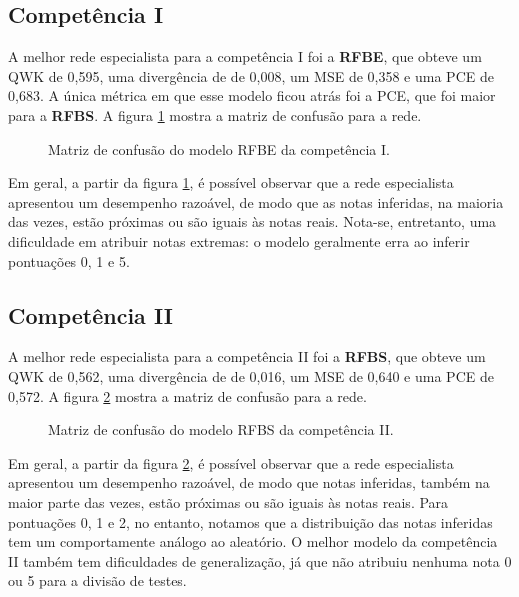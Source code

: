\subsection{Competência I}
\label{subsec:eval-c1}

A melhor rede especialista para a competência I foi a \textbf{RFBE}, que obteve um QWK de 0,595, uma divergência de de 0,008, um MSE de 0,358 e uma PCE de 0,683. A única métrica em que esse modelo ficou atrás foi a PCE, que foi maior para a \textbf{RFBS}. A figura \ref{fig:eval-c1-confusion-matrix} mostra a matriz de confusão para a rede.

\begin{figure}[H]
    \centering
    \resizebox{0.5\textwidth}{!}{}
    \caption{Matriz de confusão do modelo RFBE da competência I.}
    \label{fig:eval-c1-confusion-matrix}
\end{figure}

Em geral, a partir da figura \ref{fig:eval-c1-confusion-matrix}, é possível observar que a rede especialista apresentou um desempenho razoável, de modo que as notas inferidas, na maioria das vezes, estão próximas ou são iguais às notas reais. Nota-se, entretanto, uma dificuldade em atribuir notas extremas: o modelo geralmente erra ao inferir pontuações 0, 1 e 5.

\subsection{Competência II}
\label{subsec:eval-c2}

A melhor rede especialista para a competência II foi a \textbf{RFBS}, que obteve um QWK de 0,562, uma divergência de de 0,016, um MSE de 0,640 e uma PCE de 0,572. A figura \ref{fig:eval-c2-confusion-matrix} mostra a matriz de confusão para a rede.

\begin{figure}[H]
    \centering
    \resizebox{0.5\textwidth}{!}{}
    \caption{Matriz de confusão do modelo RFBS da competência II.}
    \label{fig:eval-c2-confusion-matrix}
\end{figure}

Em geral, a partir da figura \ref{fig:eval-c2-confusion-matrix}, é possível observar que a rede especialista apresentou um desempenho razoável, de modo que notas inferidas, também na maior parte das vezes, estão próximas ou são iguais às notas reais. Para pontuações 0, 1 e 2, no entanto, notamos que a distribuição das notas inferidas tem um comportamente análogo ao aleatório. O melhor modelo da competência II também tem dificuldades de generalização, já que não atribuiu nenhuma nota 0 ou 5 para a divisão de testes.


